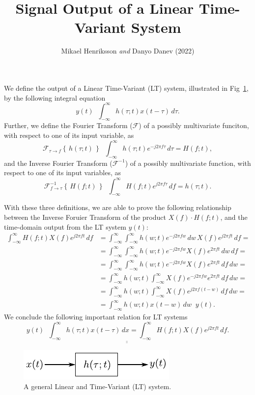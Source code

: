 \documentclass{article}
\author{Mikael Henriksson \emph{and} Danyo Danev (2022)}
\title{Signal Output of a Linear Time-Variant System}
\date{}
\newcommand*{\eqdefU}{\ensuremath{\mathop{\overset{\mathrm{def}}{=}}}}
\newcommand*{\inft}{ \int_{-\infty}^{\infty} }
\begin{document}
\maketitle

We define the output of a Linear Time-Variant (LT) system, illustrated in Fig~\ref{fig:sys}, by the following integral equation
\begin{equation}
    y(t) \eqdefU \inft h(\tau;t) x(t-\tau) \,d\tau.
\end{equation}
Further, we define the Fourier Transform ($\mathcal{F}$) of a possibly multivariate funciton, with respect to one of its input variable, as
\begin{equation}
    \mathcal{F}_{\tau \rightarrow f} \left\{ \, h(\tau;t) \, \right\} \eqdefU \inft h(\tau;t) e^{-j2\pi f\tau} \,d\tau = H(f;t),
\end{equation}
and the Inverse Fourier Transform ($\mathcal{F}^{-1}$) of a possibly multivariate function, with respect to one of its input variables, as
\begin{equation}
    \mathcal{F}^{-1}_{f \rightarrow \tau} \left\{ \, H(f;t) \, \right\} \eqdefU \inft H(f;t) e^{j2\pi f\tau} \,df = h(\tau;t).
\end{equation}

With these three definitions, we are able to prove the following relationship between the Inverse Foruier Transform of the product
$X(f) \cdot H(f;t)$, and the time-domain output from the LT system $y(t)$:
\begin{equation}
    \begin{split}
        \inft H(f;t)X(f)e^{j2\pi ft} \, df &= \inft \inft h(w;t)e^{-j2\pi fw} \,dw \, X(f)e^{j2\pi ft} \,df = \\
        &= \inft \inft h(w;t)e^{-j2\pi fw} X(f) e^{2\pi ft} \,dw \, df = \\
        &= \inft \inft h(w;t)e^{-j2\pi fw} X(f) e^{2\pi ft} \,df \, dw = \\
        &= \inft h(w;t) \inft X(f) e^{-j2\pi fw} e^{2\pi ft} \,df \, dw = \\
        &= \inft h(w;t) \inft X(f) e^{j2\pi f(t-w)} \,df \, dw = \\
        &= \inft h(w;t) x(t-w) \, dw \eqdefU y(t).
    \end{split}
\end{equation}
We conclude the following important relation for LT systems
\begin{equation}
    \underline{\underline{y(t) \eqdefU \inft h(\tau;t) x(t-\tau) \,dx = \inft H(f;t)X(f)e^{j2\pi ft} \, df}}.
\end{equation}

\begin{figure}[]
    \centering
    \includegraphics{lt-system.pdf}
    \caption{A general Linear and Time-Variant (LT) system.}
    \label{fig:sys}
\end{figure}
\end{document}
